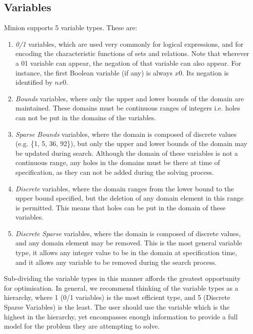 \documentclass{article}
\begin{document}
\begin{small}
\section{Variables}

{\sc Minion} supports 5 variable types. These are: 
\begin{enumerate}
\item \emph{0/1} variables, which are used very commonly for logical
expressions, and for encoding the characteristic functions of sets and
relations. Note that wherever a 01 variable can appear, the negation
of that variable can also appear. For instance, the first Boolean
variable (if any) is always $x0$. Its negation is identified by $nx0$.
\item \emph{Bounds} variables, where only the upper and lower bounds
of the domain are maintained. These domains must be continuous ranges
of integers i.e. holes can not be put in the domains of the variables.
\item \emph{Sparse Bounds} variables, where the domain is composed of
discrete values (e.g. \{1, 5, 36, 92\}), but only the upper and lower
bounds of the domain may be updated during search. Although the domain
of these variables is not a continuous range, any holes in the domains
must be there at time of specification, as they can not be added
during the solving process.
\item \emph{Discrete} variables, where the domain ranges from the
lower bound to the upper bound specified, but the deletion of any
domain element in this range is permitted. This means that holes can
be put in the domain of these variables.
\item \emph{Discrete Sparse} variables, where the domain is composed of discrete values, and any domain element may be removed. This is the most general variable type, it allows any integer value to be in the domain at specification time, and it allows any variable to be removed during the search process.
\end{enumerate}
Sub-dividing the variable types in this manner affords the greatest opportunity for optimisation. In general, we recommend thinking of the variable types as a hierarchy, where 1 (0/1 variables) is the most efficient type, and 5 (Discrete Sparse Variables) is the least. The user should use the variable which is the highest in the hierarchy, yet encompasses enough information to provide a full model for the problem they are attempting to solve.


\end{small}
\end{document}
